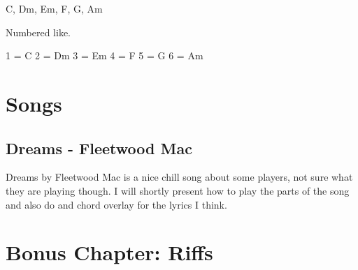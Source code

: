\documentclass[11pt]{book}
\begin{document}
    C, Dm, Em, F, G, Am

    Numbered like.

    1 = C
    2 = Dm
    3 = Em
    4 = F
    5 = G
    6 = Am


    \chapter{Songs}


    \section{Dreams - Fleetwood Mac}
    Dreams by Fleetwood Mac is a nice chill song about some players, not sure what they are playing though.
    I will shortly present how to play the parts of the song and also do and chord overlay for the lyrics I think.

    \begin{guitar}
    \end{guitar}
    \chapter*{Bonus Chapter: Riffs}
\end{document}
